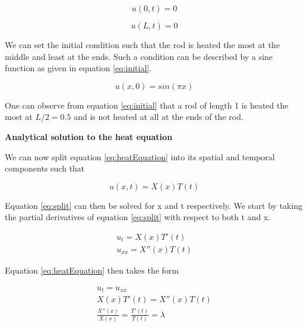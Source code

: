 \documentclass[12pt,a4paper]{article}
\begin{document}
\begin{equation}\label{eq:boundary0}
u(0,t) = 0
\end{equation}

\begin{equation}\label{eq:boundaryL}
u(L,t) = 0
\end{equation}

\noindent We can set the initial condition such that the rod is heated the most at the middle and least at the ends. Such a condition can be described by a sine function as given in equation \ref{eq:initial}.

\begin{equation}\label{eq:initial}
u(x,0) = sin(\pi x)
\end{equation}

\noindent One can observe from equation \ref{eq:initial} that a rod of length 1 is heated the most at $L/2 = 0.5$ and is not heated at all at the ends of the rod. 

\begin{center}
\large{\textbf{Analytical solution to the heat equation}}
\end{center}

\noindent We can now split equation \ref{eq:heatEquation} into its spatial and temporal components such that 

\begin{equation}\label{eq:split}
u(x,t) = X(x)T(t)
\end{equation}

\noindent Equation \ref{eq:split} can then be solved for x and t respectively. We start by taking the partial derivatives of equation \ref{eq:split} with respect to both t and x.

\begin{equation}\label{eq:split2}
\begin{aligned}
u_t = X(x)T'(t)
\\
u_{xx} = X''(x)T(t)
\end{aligned}
\end{equation}

\noindent Equation \ref{eq:heatEquation} then takes the form

\begin{equation}\label{eq:heatSplit}
\begin{aligned}
u_t = u_{xx}
\\
X(x)T'(t) = X''(x)T(t)
\\
\frac{X''(x)}{X(x)} = \frac{T'(t)}{T(t)} = \lambda
\end{aligned}
\end{equation}
\end{document}
